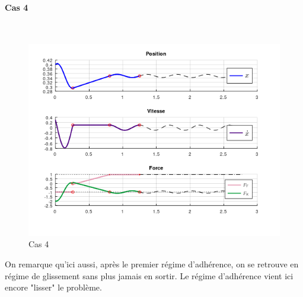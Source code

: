 \documentclass{article}
\begin{document}
\paragraph{Cas 4}
$ $

\begin{figure}[h!]
	\centering
	\includegraphics[scale=.75]{CAS4.png}
	\caption{Cas 4}
\end{figure}


\medskip
On remarque qu'ici aussi, après le premier régime d'adhérence, on se retrouve en régime de glissement sans plus jamais en sortir. Le régime d'adhérence vient ici encore "lisser" le problème. 
\end{document}
